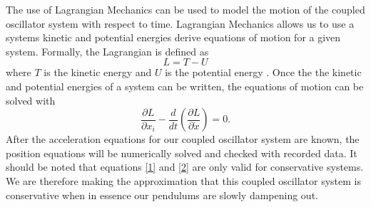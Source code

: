 \documentclass[twocolumn]{article}
\begin{document}
The use of Lagrangian Mechanics can be used to model the motion of the coupled oscillator system with respect to time. Lagrangian Mechanics allows us to use a systems kinetic and potential energies derive equations of motion for a given system. Formally, the Lagrangian is defined as
\begin{equation}\label{1}
L=T-U
\end{equation}
where $T$ is the kinetic energy and $U$ is the potential energy \cite{WikiLagrange}. Once the the kinetic and potential energies of a system can be written, the equations of motion can be solved with \cite{WikiLagrange}
\begin{equation}\label{2}
\frac{\partial L}{\partial x_{i}}-\frac{d}{dt}(\frac{\partial L}{\partial \dot{x}})=0.
\end{equation}
After the acceleration equations for our coupled oscillator system are known, the position equations will be numerically solved and checked with recorded data. It should be noted that equations \ref{1} and \ref{2} are only valid for conservative systems. We are therefore making the approximation that this coupled oscillator system is conservative when in essence our pendulums are slowly dampening out.
\end{document}
